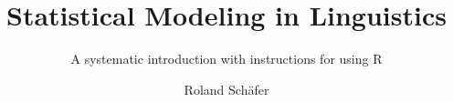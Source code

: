 \title{Statistical Modeling in Linguistics}
\subtitle{A systematic introduction with instructions for using R}
\dedication{Dedicated to a randomly chosen individual.}
\author{Roland Schäfer}
\renewcommand{\lsISBNdigital}{000-0-000000-00-0}
\renewcommand{\lsISBNhardcover}{000-0-000000-00-0}
\renewcommand{\lsISBNsoftcover}{000-0-000000-00-0}
\renewcommand{\lsISBNsoftcoverus}{000-0-000000-00-0}
\renewcommand{\lsSeries}{tbls}
\renewcommand{\lsSeriesNumber}{99}
  
